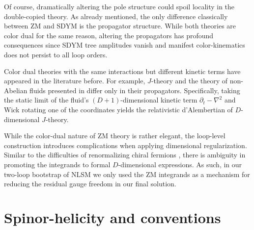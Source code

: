\documentclass[11pt,letter]{article}
\begin{document}
Of course, dramatically altering the pole structure could spoil locality in the
double-copied theory.  As already mentioned, the only difference
classically between ZM and SDYM is the propagator structure.  While
both theories are color dual for the same reason, altering the
propagators has profound consequences since SDYM tree amplitudes
vanish and manifest color-kinematics does not persist to all loop
orders.  

Color dual theories with the same interactions but different
kinetic terms have appeared in the literature before.  For example,
$J$-theory and the theory of non-Abelian fluids presented in
\cite{Cheung:2020djz} differ only in their propagators. Specifically,
taking the static limit of the fluid's $(D+1)$-dimensional kinetic
term $\partial_t - \nabla^2$ and Wick rotating one of the coordinates
yields the relativistic d'Alembertian of $D$-dimensional $J$-theory.

While the color-dual nature of ZM theory is rather elegant, the
loop-level construction introduces complications when applying
dimensional regularization. Similar to the difficulties of
renormalizing chiral fermions \cite{tHooft:1972tcz}, there is ambiguity
in promoting the integrands to formal $D$-dimensional expressions. As
such, in our two-loop bootstrap of NLSM we only used the ZM
integrands as a mechanism for reducing the residual gauge freedom in
our final solution.

\section{Spinor-helicity and conventions}\label{Conventions}
\end{document}
